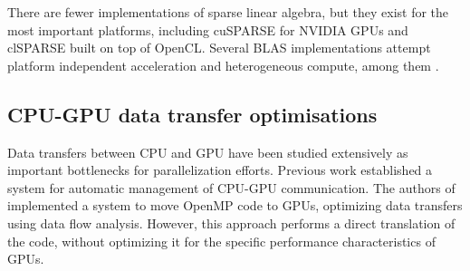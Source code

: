    There are fewer implementations of sparse linear algebra, but they exist for
    the most important platforms, including cuSPARSE \cite{cusparse} for NVIDIA
    GPUs and clSPARSE \cite{clsparse} built on top of OpenCL.
    Several BLAS implementations attempt platform independent acceleration and
    heterogeneous compute, among them \citet{Wang:2016:BHP:2925426.2926256,
    10.1007/978-3-319-64203-1_33, Diego2017Multi}. 


\subsection{CPU-GPU data transfer optimisations}

    Data transfers between CPU and GPU have been studied extensively as
    important bottlenecks for parallelization efforts.
    Previous work \cite{Jablin:2011:ACC:1993316.1993516} established a system
    for automatic management of CPU-GPU communication.
    The authors of \cite{Lee:2009:OGC:1594835.1504194} implemented a system to
    move OpenMP code to GPUs, optimizing data transfers using data flow
    analysis.
    However, this approach performs a direct translation of the code, without
    optimizing it for the specific performance characteristics of GPUs.


